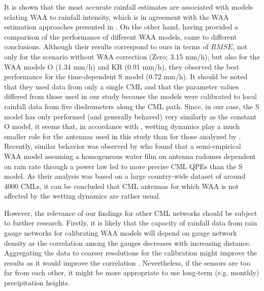 \documentclass{ctuthesis}\usepackage[]{graphicx}\usepackage[]{color}
\begin{document}
It is shown that the most accurate rainfall estimates are associated with models relating WAA to rainfall intensity, which is in agreement with the WAA estimation approaches presented in \cite{valtrExcessAttenuationCaused2019, kharadlyEffectWetAntenna2001, leijnseMicrowaveLinkRainfall2008, fenclQuantifyingWetAntenna2019}. On the other hand, having provided a comparison of the performance of different WAA models, \cite{schleissQuantificationModelingWetAntenna2013} came to different conclusions. Although their results correspond to ours in terms of $RMSE$, not only for the scenario without WAA correction (Zero; 3.15 mm/h), but also for the WAA models O (1.34 mm/h) and KR (0.91 mm/h), they observed the best performance for the time-dependent S model (0.72 mm/h). It should be noted that they used data from only a single CML and that the parameter values differed from those used in our study because the models were calibrated to local rainfall data from five disdrometers along the CML path. Since, in our case, the S model has only performed (and generally behaved) very similarly as the constant O model, it seems that, in accordance with \cite{lethMeasurementCampaignAssess2018}, wetting dynamics play a much smaller role for the antennas used in this study than for those analyzed by \cite{schleissQuantificationModelingWetAntenna2013}. Recently, similar behavior was observed by \cite{grafRainfallEstimationGermanwide2020} who found that a semi-empirical WAA model assuming a homogeneous water film on antenna radomes dependent on rain rate through a power law \citep{leijnseMicrowaveLinkRainfall2008} led to more precise CML QPEs than the S model. As their analysis was based on a large country-wide dataset of around 4000 CMLs, it can be concluded that CML antennas for which WAA is not affected by the wetting dynamics are rather usual.

However, the relevance of our findings for other CML networks should be subject to further research. Firstly, it is likely that the capacity of rainfall data from rain gauge networks for calibrating WAA models will depend on gauge network density as the correlation among the gauges decreases with increasing distance. Aggregating the data to coarser resolutions for the calibration might improve the results as it would improve the correlation \citep{villariniRainfallSamplingUncertainties2008}. Nevertheless, if the sensors are too far from each other, it might be more appropriate to use long-term (e.g. monthly) precipitation heights. 
\end{document}

